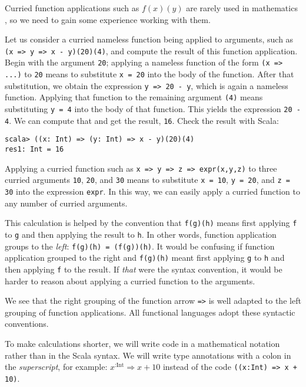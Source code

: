 Curried function applications such as $f(x)(y)$ are rarely used in
mathematics , so we need to gain some experience working with them.

Let us consider a curried nameless function being applied to arguments,
such as \lstinline!(x => y => x - y)(20)(4)!, and compute the result
of this function application. Begin with the argument \lstinline!20!;
applying a nameless function of the form \lstinline!(x => ...)! to
\lstinline!20! means to substitute \lstinline!x = 20! into the body
of the function. After that substitution, we obtain the expression
\lstinline!y => 20 - y!, which is again a nameless function. Applying
that function to the remaining argument \lstinline!(4)! means substituting
\lstinline!y = 4! into the body of that function. This yields the
expression \lstinline!20 - 4!. We can compute that and get the result,
\lstinline!16!. Check the result with Scala:
\begin{lstlisting}
scala> ((x: Int) => (y: Int) => x - y)(20)(4)
res1: Int = 16
\end{lstlisting}

Applying a curried function such as \lstinline!x => y => z => expr(x,y,z)!
to three curried arguments \lstinline!10!, \lstinline!20!, and \lstinline!30!
means to substitute \lstinline!x = 10!, \lstinline!y = 20!, and
\lstinline!z = 30! into the expression \lstinline!expr!. In this
way, we can easily apply a curried function to any number of curried
arguments.

This calculation is helped by the convention that \lstinline!f(g)(h)!
means first applying \lstinline!f! to \lstinline!g! and then applying
the result to \lstinline!h!. In other words, function application
groups to the \emph{left}: \lstinline!f(g)(h) = (f(g))(h)!. It would
be confusing if function application grouped to the right and \lstinline!f(g)(h)!
meant first applying \lstinline!g! to \lstinline!h! and then applying
\lstinline!f! to the result. If \emph{that} were the syntax convention,
it would be harder to reason about applying a curried function to
the arguments.

We see that the right grouping of the function arrow \lstinline!=>!
is well adapted to the left grouping of function applications. All
functional languages adopt these syntactic conventions.

To make calculations shorter, we will write code in a mathematical
notation rather than in the Scala syntax. We will write type annotations
with a colon in the \emph{superscript}, for example: $x^{:\text{Int}}\Rightarrow x+10$
instead of the code \lstinline!((x:Int) => x + 10)!.


